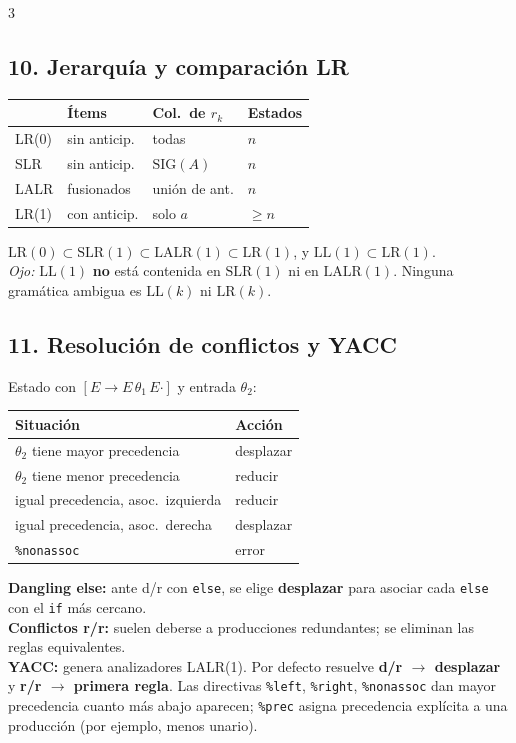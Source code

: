\begin{landscape}
\begin{multicols*}{3}
\subsection*{10. Jerarquía y comparación LR}
\begin{tabular}{@{}lllp{1.3cm}@{}}
\toprule
 & \textbf{Ítems} & \textbf{Col.\ de $r_k$} & \textbf{Estados}\\
\midrule
LR(0) & sin anticip. & todas & $n$\\
SLR & sin anticip. & $\mathrm{SIG}(A)$ & $n$\\
LALR & fusionados & unión de ant. & $n$\\
LR(1) & con anticip. & solo $a$ & $\ge n$\\
\bottomrule
\end{tabular}

\smallskip
$\mathrm{LR}(0)\subset\mathrm{SLR}(1)\subset\mathrm{LALR}(1)\subset\mathrm{LR}(1)$, y $\mathrm{LL}(1)\subset\mathrm{LR}(1)$.\\
\emph{Ojo:} $\mathrm{LL}(1)$ \textbf{no} está contenida en $\mathrm{SLR}(1)$ ni en $\mathrm{LALR}(1)$. Ninguna gramática ambigua es $\mathrm{LL}(k)$ ni $\mathrm{LR}(k)$.

\columnbreak

\subsection*{11. Resolución de conflictos y YACC}
Estado con $[E\to E\,\theta_1\,E\mathbin{\boldsymbol{\cdot}}]$ y entrada $\theta_2$:

\smallskip
\begin{tabular}{@{}ll@{}}
\toprule
\textbf{Situación} & \textbf{Acción}\\
\midrule
$\theta_2$ tiene mayor precedencia & desplazar\\
$\theta_2$ tiene menor precedencia & reducir\\
igual precedencia, asoc.\ izquierda & reducir\\
igual precedencia, asoc.\ derecha & desplazar\\
\texttt{\%nonassoc} & error\\
\bottomrule
\end{tabular}

\smallskip
\textbf{Dangling else:} ante d/r con \texttt{else}, se elige \textbf{desplazar} para asociar cada \texttt{else} con el \texttt{if} más cercano.\\
\textbf{Conflictos r/r:} suelen deberse a producciones redundantes; se eliminan las reglas equivalentes.\\
\textbf{YACC:} genera analizadores LALR(1). Por defecto resuelve \textbf{d/r $\to$ desplazar} y \textbf{r/r $\to$ primera regla}. Las directivas \texttt{\%left}, \texttt{\%right}, \texttt{\%nonassoc} dan mayor precedencia cuanto más abajo aparecen; \texttt{\%prec} asigna precedencia explícita a una producción (por ejemplo, menos unario).


\end{multicols*}
\end{landscape}

